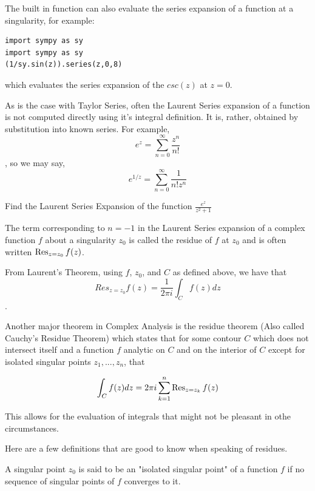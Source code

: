 The built in function  can also evaluate the series expansion of a function at a singularity, for example:

\begin{lstlisting}[style=python]
import sympy as sy
import sympy as sy
(1/sy.sin(z)).series(z,0,8)
\end{lstlisting}

which evaluates the series expansion of the $csc(z)$ at $z=0$. 

As is the case with Taylor Series, often the Laurent Series expansion of a function is not computed directly using it's integral definition. It is, rather, obtained by substitution into known series. For example, 
$$e^z = \sum_{n=0}^{\infty} \frac{z^n}{n!}$$, so we may say,
$$e^{1/z} = \sum_{n=0}^{\infty} \frac{1}{n! z^n}$$

\begin{problem}
Find the Laurent Series Expansion of the function $\frac{e^{z}}{z^2 +1}$
\end{problem}


The term corresponding to $n=-1$ in the Laurent Series expansion of a complex function $f$ about a singularity $z_0$ is called the residue of $f$ at $z_0$ and is often written $\operatorname{Res}_{z=z_0} f(z)$.

From Laurent's Theorem, using $f$, $z_0$, and $C$ as defined above, we have that $$Res_{z=z_0} f(z) = \frac{1}{2 \pi i} \int_C f(z) dz$$.

Another major theorem in Complex Analysis is the residue theorem (Also called Cauchy's Residue Theorem) which states that for some contour $C$ which does not intersect itself and a function $f$ analytic on $C$ and on the interior of $C$ except for isolated singular points $z_1,...,z_n$, that 

$$\int_C f(z) dz = 2 \pi i \sum_{k=1}^{n} \operatorname{Res}_{z=z_k} f(z)$$

This allows for the evaluation of integrals that might not be pleasant in othe circumstances.


Here are a few definitions that are good to know when speaking of residues.

A singular point $z_0$ is said to be an "isolated singular point" of a function $f$ if no sequence of singular points of $f$ converges to it.

